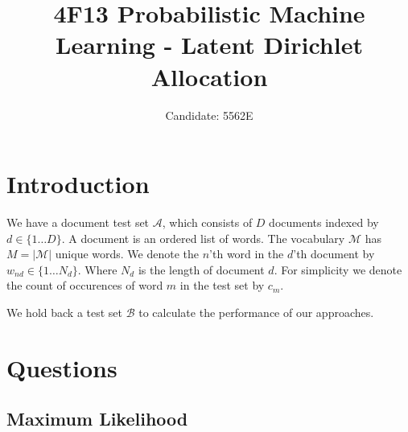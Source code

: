 \documentclass[]{article}
\title{4F13 Probabilistic Machine Learning - Latent Dirichlet Allocation}
\author{Candidate: 5562E}
\newcommand{\Acal}{\mathcal{A}}
\newcommand{\Bcal}{\mathcal{B}}
\newcommand{\Mcal}{\mathcal{M}}
\begin{document}


\setcounter{page}{1}
\maketitle

\tableofcontents

\section{Introduction}

We have a document test set $\Acal$, which consists of $D$ documents indexed by $d \in \{1 \dots D\}$. A document is an ordered list of words. The vocabulary $\Mcal$ has $M=|\Mcal|$ unique words. We denote the $n$'th word in the $d$'th document by $w_{nd} \in \{1 \dots N_d\}$. Where $N_d$ is the length of document $d$. For simplicity we denote the count of occurences of word $m$ in the test set by $c_m$.

We hold back a test set $\Bcal$ to calculate the performance of our approaches.

\section{Questions}
\subsection{Maximum Likelihood}
\end{document}
